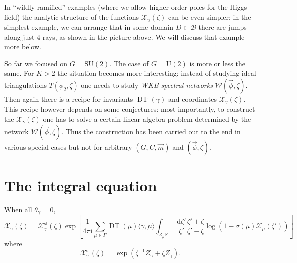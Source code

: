 \documentclass[12pt,letterpaper,reqno]{article}
\numberwithin{equation}{section}
\newcommand{\cB}{\ensuremath{\mathcal B}}
\newcommand{\cX}{\ensuremath{\mathcal X}}
\newcommand{\cW}{\ensuremath{\mathcal W}}
\newcommand{\R}{\ensuremath{\mathbb R}}
\newcommand{\I}{{\mathrm i}}
\newcommand{\de}{\mathrm{d}}
\renewcommand{\sf}{\mathrm{sf}}
\newcommand{\IP}[1]{\langle#1\rangle}
\newcommand{\vphi}{{\vec\phi}}
\newcommand{\ti}[1]{\textit{#1}}
\DeclareMathOperator{\DT}{DT}
\newcommand{\SU}{\mathrm{SU}}
\newcommand{\U}{\mathrm{U}}
\begin{document}
\begin{remark}
In ``wildly ramified'' examples (where we allow higher-order poles
for the Higgs field) the analytic structure of the functions $\cX_\gamma(\zeta)$ 
can be even simpler: in the simplest example, 
we can arrange that in some domain $D \subset \cB$
there are jumps along just $4$ rays,
as shown in the picture above. We will discuss that example
more below.
\end{remark}

\begin{remark}
So far we focused on $G = \SU(2)$. The case of $G = \U(2)$ is more or
less the same. For $K>2$ the situation becomes more interesting:
instead of studying ideal triangulations $T(\phi_2, \zeta)$ 
one needs to study \ti{WKB spectral networks} $\cW(\vphi, \zeta)$.
Then again there is a recipe for invariants $\DT(\gamma)$
and coordinates $\cX_\gamma(\zeta)$. This recipe however 
depends on some conjectures:
most importantly, to construct the $\cX_\gamma(\zeta)$ 
one has to solve a certain linear algebra problem determined by the 
network $\cW(\vphi,\zeta)$.
Thus the construction has been carried out to the end in various special
cases but not for arbitrary $(G,C,\vec{m})$ and $(\vphi, \zeta)$.
\end{remark}

\section{The integral equation}

\begin{conj}[Integral equation for $\theta_\gamma = 0$]
When all $\theta_\gamma = 0$,
\begin{equation}
  \cX_\gamma(\zeta) = \cX_\gamma^\sf(\zeta) \exp \left[ \frac{1}{4\pi \I} \sum_{\mu \in \Gamma} \DT(\mu) \IP{\gamma,\mu} \int_{Z_\mu \R_-} \frac{\de \zeta'}{\zeta'} \frac{\zeta' + \zeta}{\zeta'-\zeta} \log(1 - \sigma(\mu) \cX_\mu(\zeta')) \right]
\end{equation}
where 
\begin{equation}
  \cX_\gamma^\sf(\zeta) = \exp \left( \zeta^{-1} Z_\gamma + \zeta \overline{Z}_\gamma \right).
\end{equation}
\end{conj}
\end{document}
